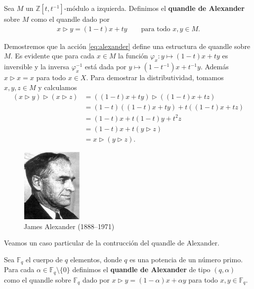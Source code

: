 \documentclass[graybox]{svmult}
\newcommand{\Z}{\mathbb{Z}}
\newcommand{\F}{\mathbb{F}}
\begin{document}
\begin{example}
    \label{block:alexander}
    Sea $M$ un $\Z[t,t^{-1}]$-módulo a izquierda.  Definimos el \textbf{quandle
    de Alexander} sobre $M$ como el quandle dado por 
    \begin{align}
        \label{eq:alexander}
        x\triangleright y=(1-t)x+t y\qquad\text{para todo $x,y\in M$.}
    \end{align}

    Demostremos que la acción \eqref{eq:alexander} define una estructura de
    quandle sobre $M$. Es evidente que para cada $x\in M$ la función
    $\varphi_x\colon y\mapsto (1-t)x+ty$ es inversible y la inversa
    $\varphi_x^{-1}$ está dada por $y\mapsto (1-t^{-1})x+t^{-1}y$.
    Además $x\triangleright x=x$ para todo $x\in X$. Para demostrar la
    distributividad, tomamos $x,y,z\in M$ y calculamos
    \begin{align*}
        (x\triangleright y)\triangleright (x\triangleright z) &= \left( (1-t)x+ty \right)\triangleright \left( (1-t)x+tz \right)\\
        &= (1-t)\left( (1-t)x+t y \right)+t\left( (1-t)x+t z \right)\\
        &= (1-t)x+t(1-t)y+t^2z\\
        &= (1-t)x+t(y\triangleright z)\\
        &= x\triangleright(y\triangleright z).
    \end{align*}

    \begin{figure}[h]
		\centering
        \includegraphics[width=30mm,height=36mm]{images/alexander}
        \caption{James Alexander (1888--1971)}
    \end{figure}
\end{example}

	Veamos un caso particular de la contrucción del quandle de Alexander. 

\begin{example}
    Sea $\F_q$ el cuerpo de $q$ elementos, donde $q$ es una potencia de un
    número primo. Para cada $\alpha\in\F_q\setminus\{0\}$ definimos el
    \textbf{quandle de Alexander} de tipo $(q,\alpha)$ como el quandle sobre 
    $\F_q$ dado por 
    $x\triangleright y=(1-\alpha)x+\alpha y$ para todo $x,y\in\F_q$.
\end{example}
\end{document}
